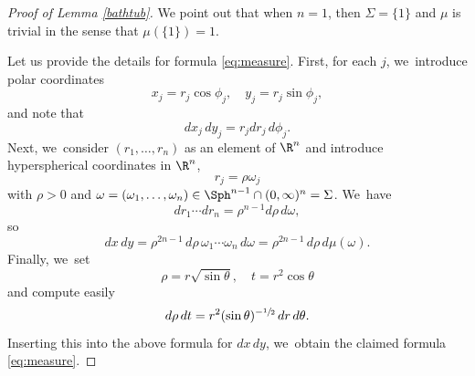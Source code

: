 \begin{proof}[Proof of Lemma \ref{bathtub}]
We point out that when $n=1$, then $\Sigma=\{1\}$ and $\mu$ is trivial in the sense that $\mu(\{1\})=1$.

Let us provide the details for formula \eqref{eq:measure}. First, for each $j$, we~introduce polar coordinates
\[
x_j = r_j \cos\phi_j,
\quad
y_j = r_j \sin\phi_j,
\]
and note that
\[
dx_j\,dy_j = r_j dr_j \,d\phi_j.
\]
Next, we~consider $(r_1,\ldots,r_n)$ as an element of $\R^n$ and introduce hyperspherical coordinates in $\R^n$,
\[
r_j = \rho \omega_j
\]
with $\rho>0$ and $\omega=(\omega_1,\ldots,\omega_n)\in\Sph^{n-1}\cap(0,\infty)^n=\Sigma$. We~have
\[
dr_1\cdots dr_n = \rho^{n-1}d\rho\,d\omega,
\]
so
\[
dx\,dy = \rho^{2n-1} \,d\rho\,\omega_1\cdots\omega_n \,d\omega = \rho^{2n-1}\,d\rho\,d\mu(\omega).
\]
Finally, we~set
\[
\rho = r \sqrt{\sin\theta},
\quad
t= r^2 \cos\theta
\]
and compute easily
\[
d\rho\,dt = r^2 (\sin\theta)^{-\sfrac12}\,dr\,d\theta.
\]
Inserting this into the above formula for $dx\,dy$, we~obtain the claimed formula \eqref{eq:measure}.


\end{proof}
